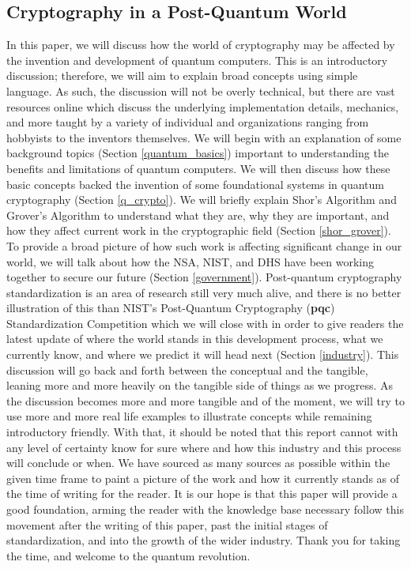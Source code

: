 \subsection{Cryptography in a Post-Quantum World} 
In this paper, we will discuss how the world of cryptography may be affected by the invention and development of quantum computers. This is an introductory discussion; therefore, we will aim to explain broad concepts using simple language. As such, the discussion will not be overly technical, but there are vast resources online which discuss the underlying implementation details, mechanics, and more taught by a variety of individual and organizations ranging from hobbyists to the inventors themselves. We will begin with an explanation of some background topics (Section \ref{quantum_basics}) important to understanding the benefits and limitations of quantum computers. We will then discuss how these basic concepts backed the invention of some foundational systems in quantum cryptography (Section \ref{q_crypto}). We will briefly explain Shor's Algorithm and Grover's Algorithm to understand what they are, why they are important, and how they affect current work in the cryptographic field (Section \ref{shor_grover}). To provide a broad picture of how such work is affecting significant change in our world, we will talk about how the NSA, NIST, and DHS have been working together to secure our future (Section \ref{government}). Post-quantum cryptography standardization is an area of research still very much alive, and there is no better illustration of this than NIST's Post-Quantum Cryptography (\textbf{\gls{pqc}}) Standardization Competition which we will close with in order to give readers the latest update of where the world stands in this development process, what we currently know, and where we predict it will head next (Section \ref{industry}). This discussion will go back and forth between the conceptual and the tangible, leaning more and more heavily on the tangible side of things as we progress. As the discussion becomes more and more tangible and of the moment, we will try to use more and more real life examples to illustrate concepts while remaining introductory friendly. With that, it should be noted that this report cannot with any level of certainty know for sure where and how this industry and this process will conclude or when. We have sourced as many sources as possible within the given time frame to paint a picture of the work and how it currently stands as of the time of writing for the reader. It is our hope is that this paper will provide a good foundation, arming the reader with the knowledge base necessary follow this movement after the writing of this paper, past the initial stages of standardization, and into the growth of the wider industry. Thank you for taking the time, and welcome to the quantum revolution. 



